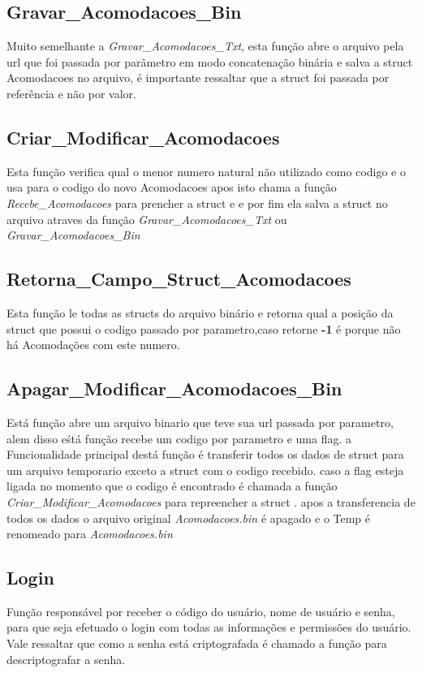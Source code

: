 \documentclass{article}
\begin{document}
\subsection{Gravar\_Acomodacoes\_Bin}
	Muito semelhante a \textit{Gravar\_Acomodacoes\_Txt}, esta função abre o arquivo pela url que foi passada por parâmetro em modo concatenação binária e salva a struct Acomodacoes  no arquivo, é importante ressaltar que  a struct foi passada por referência e não por valor.

\subsection{Criar\_Modificar\_Acomodacoes}
	Esta função verifica qual o menor numero natural não utilizado como codigo e o usa para o codigo do novo Acomodacoes apos isto  chama a função \textit{Recebe\_Acomodacoes} para prencher a struct e e por fim ela salva a struct no arquivo atraves da função \textit{Gravar\_Acomodacoes\_Txt} ou \textit{Gravar\_Acomodacoes\_Bin}

\subsection{Retorna\_Campo\_Struct\_Acomodacoes}
	Esta função le todas as structs do arquivo binário e retorna qual a posição da struct que possui o codigo passado por parametro,caso retorne \textbf{-1} é porque não há Acomodações com este numero.

\subsection{Apagar\_Modificar\_Acomodacoes\_Bin}
	Está função abre um arquivo binario que teve sua  url passada por parametro, alem disso eśtá função recebe um codigo por parametro e uma flag.
	a Funcionalidade principal destá função é transferir todos os dados de struct para um arquivo temporario exceto a struct com o codigo recebido. caso a flag esteja ligada no momento que o codigo é encontrado é chamada a função \textit{Criar\_Modificar\_Acomodacoes} para repreencher a struct . apos a transferencia de todos os dados o arquivo original \textit{Acomodacoes.bin} é apagado e o Temp é renomeado para \textit{Acomodacoes.bin}

\subsection{Login}
	Função responsável por receber o código do usuário, nome de usuário e senha, para que seja efetuado o login com todas as informações e permissões do usuário. Vale ressaltar que como a senha está criptografada é chamado a função para descriptografar a senha.
\end{document}

